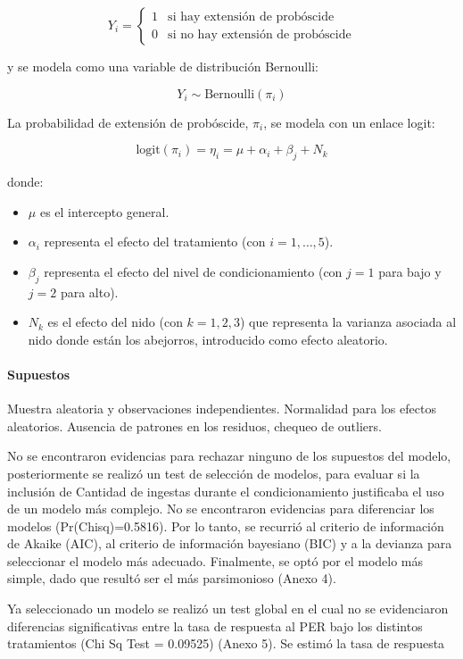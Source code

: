\documentclass[
  11pt,
]{article}
\providecommand{\tightlist}{%
  \setlength{\itemsep}{0pt}\setlength{\parskip}{0pt}}
\begin{document}
\[
Y_i = 
\begin{cases} 
1 & \text{si hay extensión de probóscide} \\
0 & \text{si no hay extensión de probóscide}
\end{cases}
\]

y se modela como una variable de distribución Bernoulli:

\[
Y_i \sim \text{Bernoulli}(\pi_i)
\]

La probabilidad de extensión de probóscide, \(\pi_i\), se modela con un
enlace logit:

\[
\text{logit}(\pi_i) = \eta_i = \mu + \alpha_i + \beta_j + N_k
\]

donde:

\begin{itemize}
\tightlist
\item
  \(\mu\) es el intercepto general.
\item
  \(\alpha_i\) representa el efecto del tratamiento (con
  \(i = 1, \dots, 5\)).
\item
  \(\beta_j\) representa el efecto del nivel de condicionamiento (con
  \(j = 1\) para bajo y \(j = 2\) para alto).
\item
  \(N_k\) es el efecto del nido (con \(k = 1, 2, 3\)) que representa la
  varianza asociada al nido donde están los abejorros, introducido como
  efecto aleatorio.
\end{itemize}

\paragraph{Supuestos}\label{supuestos}

Muestra aleatoria y observaciones independientes. Normalidad para los
efectos aleatorios. Ausencia de patrones en los residuos, chequeo de
outliers.

No se encontraron evidencias para rechazar ninguno de los supuestos del
modelo, posteriormente se realizó un test de selección de modelos, para
evaluar si la inclusión de Cantidad de ingestas durante el
condicionamiento justificaba el uso de un modelo más complejo. No se
encontraron evidencias para diferenciar los modelos (Pr(Chisq)=0.5816).
Por lo tanto, se recurrió al criterio de información de Akaike (AIC), al
criterio de información bayesiano (BIC) y a la devianza para seleccionar
el modelo más adecuado. Finalmente, se optó por el modelo más simple,
dado que resultó ser el más parsimonioso (Anexo 4).

Ya seleccionado un modelo se realizó un test global en el cual no se
evidenciaron diferencias significativas entre la tasa de respuesta al
PER bajo los distintos tratamientos (Chi Sq Test = 0.09525) (Anexo 5).
Se estimó la tasa de respuesta
\end{document}
